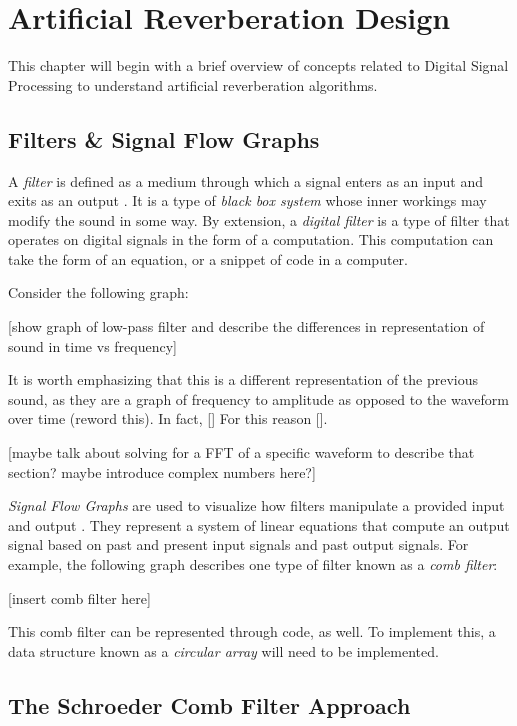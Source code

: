 \chapter{Artificial Reverberation Design}
\hspace*{-0.15cm}This chapter will begin with a brief overview of concepts related to Digital Signal Processing to understand artificial reverberation algorithms.

\section{Filters \& Signal Flow Graphs}
A \textit{filter} is defined as a medium through which a signal enters as an input and exits as an output \cite{FILTERS07}. It is a type of \textit{black box system} whose inner workings may modify the sound in some way. By extension, a \textit{digital filter} is a type of filter that operates on digital signals in the form of a computation. This computation can take the form of an equation, or a snippet of code in a computer.

Consider the following graph:

[show graph of low-pass filter and describe the differences in representation of sound in time vs frequency]

It is worth emphasizing that this is a different representation of the previous sound, as they are a graph of frequency to amplitude as opposed to the waveform over time (reword this). In fact, [] For this reason [].

[maybe talk about solving for a FFT of a specific waveform to describe that section? maybe introduce complex numbers here?]

\textit{Signal Flow Graphs} are used to visualize how filters manipulate a provided input and output \cite{FILTERS07}. They represent a system of linear equations that compute an output signal based on past and present input signals and past output signals. For example, the following graph describes one type of filter known as a \textit{comb filter}:

[insert comb filter here]


This comb filter can be represented through code, as well. To implement this, a data structure known as a \textit{circular array} will need to be implemented.

\section{The Schroeder Comb Filter Approach}


